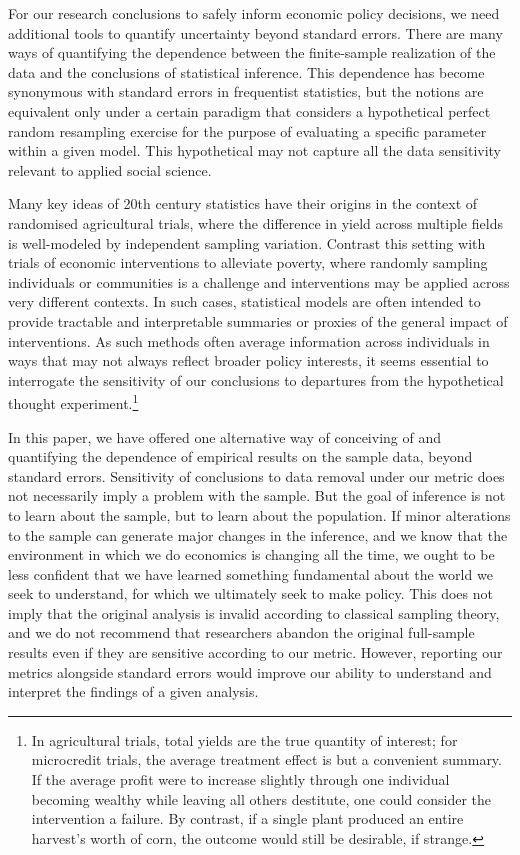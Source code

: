 
For our research conclusions to safely inform economic policy decisions, we need
additional tools to quantify uncertainty beyond standard errors. There are many
ways of quantifying the dependence between the finite-sample realization of the
data and the conclusions of statistical inference. This dependence has become
synonymous with standard errors in frequentist statistics, but the notions are
equivalent only under a certain paradigm that considers a hypothetical perfect
random resampling exercise for the purpose of evaluating a specific parameter
within a given model. This hypothetical may not capture all the data sensitivity
relevant to applied social science.

Many key ideas of 20th century statistics have their origins in the context of
randomised agricultural trials, where the difference in yield across multiple
fields is well-modeled by independent sampling variation. Contrast this setting
with trials of economic interventions to alleviate poverty, where randomly
sampling individuals or communities is a challenge and interventions may be
applied across very different contexts. In such cases, statistical models are
often intended to provide tractable and interpretable summaries or proxies of
the general impact of interventions.  As such methods often average information
across individuals in ways that may not always reflect broader policy interests,
it seems essential to interrogate the sensitivity of our conclusions to
departures from the hypothetical thought experiment.\footnote{In agricultural
trials, total yields are the true quantity of interest; for microcredit trials,
the average treatment effect is but a convenient summary. If the average profit
were to increase slightly through one individual becoming wealthy while leaving
all others destitute, one could consider the intervention a failure. By
contrast, if a single plant produced an entire harvest's worth of corn, the
outcome would still be desirable, if strange.}

In this paper, we have offered one alternative way of conceiving of and
quantifying the dependence of empirical results on the sample data, beyond
standard errors. Sensitivity of conclusions to data removal under our metric
does not necessarily imply a problem with the sample. But the goal of inference
is not to learn about the sample, but to learn about the population. If
minor alterations to the sample can generate major changes in the inference, and
we know that the environment in which we do economics is changing all the time,
we ought to be less confident that we have learned something fundamental about
the world we seek to understand, for which we ultimately seek to
make policy. This does not imply that the original analysis is invalid
according to classical sampling theory, and we do not recommend that researchers
abandon the original full-sample results even if they are sensitive according
to our metric. However, reporting our metrics alongside standard errors would
improve our ability to understand and interpret the findings of a given
analysis.

